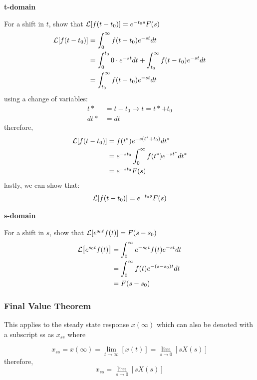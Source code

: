 \documentclass[12pt,letter]{article}
\begin{document}
\begin{mdframed}[middlelinewidth=0.5mm]
\begin{center}
\end{center}
\noindent \textbf{t-domain}

For a shift in $t$, show that $\mathcal{L}{\left[f(t-t_0)\right]} = e^{-t_0s}F(s)$
\begin{align}
\mathcal{L}{\left[f(t-t_0)\right]} &= \int_0^\infty f(t-t_0) e^{-st}dt  \\
&= \int_0^{t_0} 0 \cdot e^{-st}dt + \int_{t_0}^\infty f(t-t_0) e^{-st}dt  \nonumber \\
&= \int_{t_0}^\infty f(t-t_0) e^{-st}dt  \nonumber
\end{align}
using a change of variables:
\begin{align}
t* &= t-t_0 \rightarrow t = t*+t_0\\
dt* &= dt  \nonumber
\end{align}
therefore, 
\begin{align}
\mathcal{L}{\left[f(t-t_0)\right]} &= f(t^*)e^{-s(t^*+t_0)}dt^*     \\
&= e^{-s t_0} \int_0^{\infty} f(t^*)e^{-s t^*}dt^*  \nonumber \\
&= e^{-s t_0} F(s)  \nonumber
\end{align}
lastly, we can show that:
\begin{equation}
\mathcal{L}{\left[f(t-t_0)\right]} = e^{-t_0s}F(s)
\end{equation}

\noindent \textbf{s-domain}

For a shift in $s$, show that $\mathcal{L}{\left[e^{s_0t}f(t)\right]} = F(s-s_0)$
\begin{align}
\mathcal{L}{\left[e^{s_0t}f(t)\right]} &= \int_0^{\infty} e^{-s_0 t}  f(t)e^{-s t}dt  \nonumber \\
&=\int_0^{\infty} f(t)e^{-(s-s_0) t}dt  \nonumber \\
&= F(s-s_0)
\end{align}

\end{mdframed}

 


\subsubsection{Final Value Theorem}
This applies to the steady state response $x(\infty)$ which can also be denoted with a subscript ss as $x_{ss}$ where

\begin{equation}
x_{ss} = x(\infty)  = \lim\limits_{t\rightarrow \infty} [x(t)]  =  \lim\limits_{s\rightarrow 0} [s X(s)]
\end{equation}
therefore, 
\begin{equation}
x_{ss} =  \lim\limits_{s\rightarrow 0} [s X(s)]
\end{equation}
\end{document}
